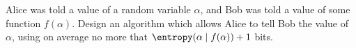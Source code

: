 Alice was told a value of a random variable $\alpha$, and Bob was told a value of some function
$f(\alpha)$. Design an algorithm which allows Alice to tell Bob the value of $\alpha$, using on average
no more that $\entropy(\alpha \mid f(\alpha)) + 1$ bits.
